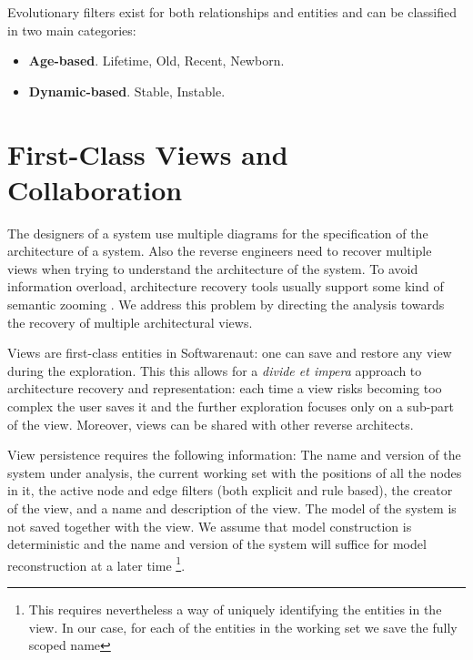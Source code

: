 \documentclass[preprint,12pt]{elsarticle}
\begin{document}
Evolutionary filters exist for both relationships and entities and can be classified in two main categories:

\begin{itemize}
\item {\bf Age-based}. Lifetime, Old, Recent, Newborn.
\item {\bf Dynamic-based}. Stable, Instable.
\end{itemize}



\newpage
\section {First-Class Views and Collaboration}

The designers of a system use multiple diagrams for the specification of the architecture of a system. Also the reverse engineers need to recover multiple views when trying to understand the architecture of the system. To avoid information overload, architecture recovery tools usually support some kind of semantic zooming \cite{storey-shrimp}. We address this problem by directing the analysis towards the recovery of multiple architectural views. 

Views are first-class entities in Softwarenaut: one can save and restore any view during the exploration. This this allows for a {\em divide et impera} approach to architecture recovery and representation: each time a view risks becoming too complex the user saves it and the further exploration focuses only on a sub-part of the view. Moreover, views can be shared with other reverse architects.

View persistence requires the following information: The name and version of the system under analysis, the current working set with the positions of all the nodes in it, the active node and edge filters (both explicit and rule based), the creator of the view, and a name and description of the view. The model of the system is not saved together with the view. We assume that model construction is deterministic and the name and version of the system will suffice for model reconstruction at a later time \footnote{This requires nevertheless a way of uniquely identifying the entities in the view. In our case, for each of the entities in the working set we save the fully scoped name}.





\end{document}
